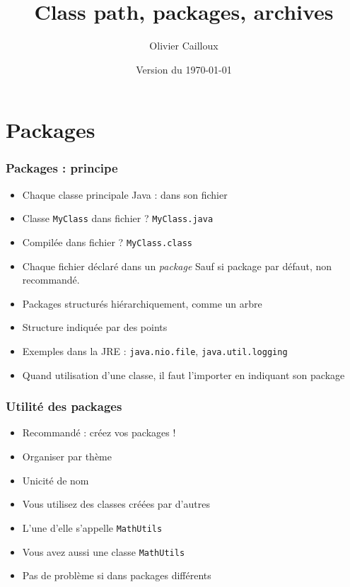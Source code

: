 \documentclass[english, french]{beamer}
\title{Class path, packages, archives}
\subtitle{}
\author{Olivier Cailloux}
\institute[LAMSADE]{LAMSADE, Université Paris-Dauphine}
\date{Version du \today}
\begin{document}


\begin{frame}[plain]
   \titlepage
\end{frame}
\addtocounter{framenumber}{-1}

\section{Packages}
\begin{frame}
	\frametitle{Packages : principe}
	\begin{itemize}
		\item Chaque classe principale Java : dans son fichier
		\item Classe \texttt{MyClass} dans fichier ? \pause \texttt{MyClass.java}
		\item Compilée dans fichier ? \pause \texttt{MyClass.class}
		\item Chaque fichier déclaré dans un \emph{package} {\tiny Sauf si package par défaut, non recommandé.}
		\item Packages structurés hiérarchiquement, comme un arbre
		\item Structure indiquée par des points
		\item Exemples dans la JRE : \texttt{java.nio.file}, \texttt{java.util.logging}
		\item Quand utilisation d’une classe, il faut l’importer en indiquant son package
	\end{itemize}
\end{frame}

\begin{frame}
	\frametitle{Utilité des packages}
	\begin{itemize}
		\item Recommandé : créez vos packages !
		\item Organiser par thème
		\item Unicité de nom
		\item Vous utilisez des classes créées par d’autres
		\item L’une d’elle s’appelle \texttt{MathUtils}
		\item Vous avez aussi une classe \texttt{MathUtils}
		\item Pas de problème si dans packages différents
	\end{itemize}
\end{frame}
\end{document}
